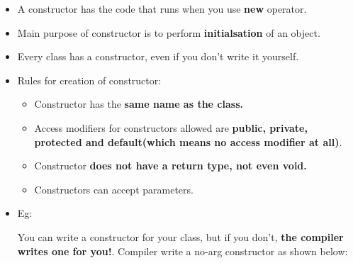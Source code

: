 \setlength{\columnsep}{3pt}
\begin{flushleft}

	\begin{itemize}
		\item A constructor has the code that runs when you use \textbf{new} operator. 
		\item Main purpose of constructor is to perform \textbf{initialsation} of an object.	
		\item Every class has a constructor, even if you don’t write it yourself.
		\item Rules for creation of constructor:
		\begin{itemize}
			\item Constructor has the \textbf{same name as the class.} 
			\item Access modifiers for constructors allowed are \textbf{public, private, protected and default(which means no access modifier at all)}.
			\item Constructor \textbf{does not have a return type, not even void.}
			\item Constructors can accept parameters.
			\bigskip
		\end{itemize}

		\item Eg:
		\bigskip
				
		\newpage
		{
				You can write a constructor for your class, but if you don’t, \textbf{the compiler writes one for you!}. Compiler write a no-arg constructor as shown below:
		}		
	\end{itemize}

\end{flushleft}



